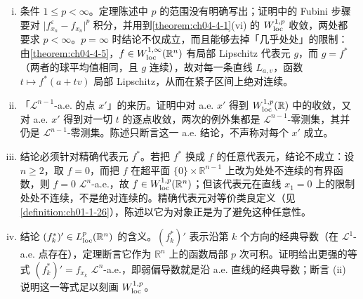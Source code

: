 ﻿\documentclass[../../main.tex]{subfiles}%
\begin{document}
\begin{remark}\label{remark:ch04-thm-4-21-条件}
\begin{enumerate}[(i)]
\item 条件 $1\leqslant p<\infty$。定理陈述中 $p$ 的范围没有明确写出；证明中的 Fubini 步骤要对 $\lvert f^{\varepsilon}_{x_{n}}-f_{x_{n}}\rvert^{p}$ 积分，并用到\cref{theorem:ch04-4-1}(vi) 的 $W^{1,p}_{\mathrm{loc}}$ 收敛，两处都要求 $p<\infty$。$p=\infty$ 时结论不仅成立，而且能够去掉「几乎处处」的限制：由\cref{theorem:ch04-4-5}，$f\in W^{1,\infty}_{\mathrm{loc}}(\mathbb{R}^{n})$ 有局部 Lipschitz 代表元 $g$，而 $g=f^{*}$（两者的球平均值相同，且 $g$ 连续），故对每一条直线 $L_{a,v}$，函数 $t\mapsto f^{*}(a+tv)$ 局部 Lipschitz，从而在紧子区间上绝对连续。%
\item 「$\mathcal{L}^{n-1}$-a.e. 的点 $x'$」的来历。证明中对 a.e. $x'$ 得到 $W^{1,p}_{\mathrm{loc}}(\mathbb{R})$ 中的收敛，又对 a.e. $x'$ 得到对一切 $t$ 的逐点收敛，两次的例外集都是 $\mathcal{L}^{n-1}$-零测集，其并仍是 $\mathcal{L}^{n-1}$-零测集。陈述只断言这一 a.e. 结论，不声称对每个 $x'$ 成立。
\item 结论必须针对精确代表元 $f^{*}$。若把 $f^{*}$ 换成 $f$ 的任意代表元，结论不成立：设 $n\geqslant2$，取 $f=0$，而把 $f$ 在超平面 $\{0\}\times\mathbb{R}^{n-1}$ 上改为处处不连续的有界函数，则 $f=0$ $\mathcal{L}^{n}$-a.e.，故 $f\in W^{1,p}_{\mathrm{loc}}(\mathbb{R}^{n})$；但该代表元在直线 $x_{1}=0$ 上的限制处处不连续，不是绝对连续的。精确代表元对等价类良定义（见\cref{definition:ch01-1-26}），陈述以它为对象正是为了避免这种任意性。%
\item 结论 $(f^{*}_{k})'\in L^{p}_{\mathrm{loc}}(\mathbb{R}^{n})$ 的含义。$(f^{*}_{k})'$ 表示沿第 $k$ 个方向的经典导数（在 $\mathcal{L}^{1}$-a.e. 点存在），定理断言它作为 $\mathbb{R}^{n}$ 上的函数局部 $p$ 次可积。证明给出更强的等式 $(f^{*}_{k})'=f_{x_{k}}$ $\mathcal{L}^{n}$-a.e.，即弱偏导数就是沿 a.e. 直线的经典导数；断言 (ii) 说明这一等式足以刻画 $W^{1,p}_{\mathrm{loc}}$。
\end{enumerate}
\end{remark}
\end{document}
